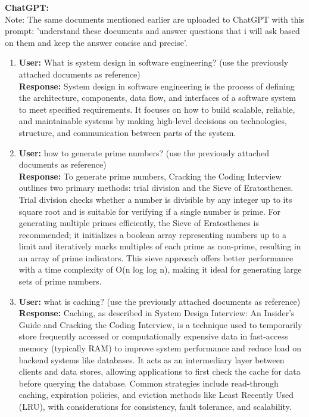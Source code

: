 \textbf{ChatGPT:}
\\Note: The same documents mentioned earlier are uploaded to ChatGPT with this prompt: 'understand these documents and answer questions that i will ask based on them and keep the answer concise and precise'.

\begin{enumerate}[label=\arabic*.]

\item \textbf{User:} What is system design in software engineering? (use the previously attached documents as reference)
\\ \textbf{Response:} System design in software engineering is the process of defining the architecture, components, data flow, and interfaces of a software system to meet specified requirements. It focuses on how to build scalable, reliable, and maintainable systems by making high-level decisions on technologies, structure, and communication between parts of the system.



\item \textbf{User:} how to generate prime numbers? (use the previously attached documents as reference)
\\ \textbf{Response:}
To generate prime numbers, Cracking the Coding Interview outlines two primary methods: trial division and the Sieve of Eratosthenes. Trial division checks whether a number is divisible by any integer up to its square root and is suitable for verifying if a single number is prime. For generating multiple primes efficiently, the Sieve of Eratosthenes is recommended; it initializes a boolean array representing numbers up to a limit and iteratively marks multiples of each prime as non-prime, resulting in an array of prime indicators. This sieve approach offers better performance with a time complexity of O(n log log n), making it ideal for generating large sets of prime numbers.


\item \textbf{User:} what is caching?  (use the previously attached documents as reference)
\\ \textbf{Response:}
Caching, as described in System Design Interview: An Insider’s Guide and Cracking the Coding Interview, is a technique used to temporarily store frequently accessed or computationally expensive data in fast-access memory (typically RAM) to improve system performance and reduce load on backend systems like databases. It acts as an intermediary layer between clients and data stores, allowing applications to first check the cache for data before querying the database. Common strategies include read-through caching, expiration policies, and eviction methods like Least Recently Used (LRU), with considerations for consistency, fault tolerance, and scalability.

\end{enumerate}

